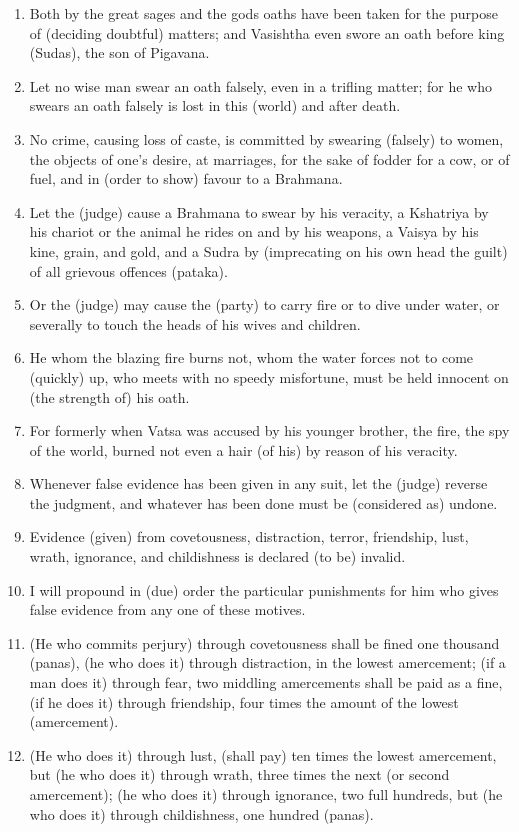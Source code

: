 \begin{enumerate}
\item Both by the great sages and the gods oaths have been taken for the purpose of (deciding doubtful) matters; and Vasishtha even swore an oath before king (Sudas), the son of Pigavana.
\item Let no wise man swear an oath falsely, even in a trifling matter; for he who swears an oath falsely is lost in this (world) and after death.
\item No crime, causing loss of caste, is committed by swearing (falsely) to women, the objects of one's desire, at marriages, for the sake of fodder for a cow, or of fuel, and in (order to show) favour to a Brahmana.
\item Let the (judge) cause a Brahmana to swear by his veracity, a Kshatriya by his chariot or the animal he rides on and by his weapons, a Vaisya by his kine, grain, and gold, and a Sudra by (imprecating on his own head the guilt) of all grievous offences (pataka).
\item Or the (judge) may cause the (party) to carry fire or to dive under water, or severally to touch the heads of his wives and children.
\item He whom the blazing fire burns not, whom the water forces not to come (quickly) up, who meets with no speedy misfortune, must be held innocent on (the strength of) his oath.
\item For formerly when Vatsa was accused by his younger brother, the fire, the spy of the world, burned not even a hair (of his) by reason of his veracity.
\item Whenever false evidence has been given in any suit, let the (judge) reverse the judgment, and whatever has been done must be (considered as) undone.
\item Evidence (given) from covetousness, distraction, terror, friendship, lust, wrath, ignorance, and childishness is declared (to be) invalid.
\item I will propound in (due) order the particular punishments for him who gives false evidence from any one of these motives.
\item (He who commits perjury) through covetousness shall be fined one thousand (panas), (he who does it) through distraction, in the lowest amercement; (if a man does it) through fear, two middling amercements shall be paid as a fine, (if he does it) through friendship, four times the amount of the lowest (amercement).
\item (He who does it) through lust, (shall pay) ten times the lowest amercement, but (he who does it) through wrath, three times the next (or second amercement); (he who does it) through ignorance, two full hundreds, but (he who does it) through childishness, one hundred (panas).

\end{enumerate}
